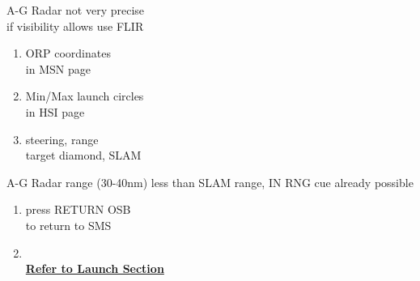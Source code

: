 \documentclass[fontHelvetica, widesubsec]{TechCheck}
\begin{document}
	 A-G Radar not very precise \\
	if visibility allows use FLIR
	\begin{enumerate}[resume]
		\item {}\dotfill ORP coordinates\\
		\hfill  in MSN page
		\item {}\dotfill Min/Max launch circles\\
		\hfill in HSI page
		\item {}\dotfill steering, range \\
		\hfill  target diamond, SLAM
	\end{enumerate}
	 A-G Radar range (30-40nm) less than SLAM range, IN RNG cue already possible
	\begin{enumerate}[resume]
		\item {}\dotfill press RETURN OSB \\
		\hfill to return to SMS
		\item {} \\
		\hfill \hyperref[subsec:84launch]{\textbf{Refer to Launch Section}}
	\end{enumerate}
\end{document}

